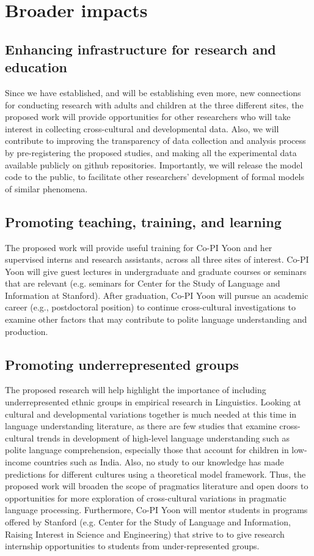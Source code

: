 \section{Broader impacts}

\subsection{Enhancing infrastructure for research and education}
Since we have established, and will be establishing even more, new connections for conducting research with adults and children at the three different sites, the proposed work will provide opportunities for other researchers who will take interest in collecting cross-cultural and developmental data.  Also, we will contribute to improving the transparency of data collection and analysis process by pre-registering the proposed studies, and making all the experimental data available publicly on github repositories. Importantly, we will release the model code to the public, to facilitate other researchers' development of formal models of similar phenomena. 

\subsection{Promoting teaching, training, and learning}
The proposed work will provide useful training for Co-PI Yoon and her supervised interns and research assistants, across all three sites of interest. Co-PI Yoon will give guest lectures in undergraduate and graduate courses or seminars that are relevant (e.g. seminars for Center for the Study of Language and Information at Stanford). After graduation, Co-PI Yoon will pursue an academic career (e.g., postdoctoral position) to continue cross-cultural investigations to examine other factors that may contribute to polite language understanding and production. 

\subsection{Promoting underrepresented groups}
The proposed research will help highlight the importance of including underrepresented ethnic groups in empirical research in Linguistics. Looking at cultural and developmental variations together is much needed at this time in language understanding literature, as there are few studies that examine cross-cultural trends in development of high-level language understanding such as polite language comprehension, especially those that account for children in low-income countries such as India. Also, no study to our knowledge has made predictions for different cultures using a theoretical model framework. Thus, the proposed work will broaden the scope of pragmatics literature and open doors to opportunities for more exploration of cross-cultural variations in pragmatic language processing. Furthermore, Co-PI Yoon will mentor students in programs offered by Stanford (e.g. Center for the Study of Language and Information, Raising Interest in Science and Engineering) that strive to to give research internship opportunities to students from under-represented groups.
 
